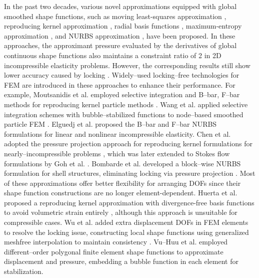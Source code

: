 In the past two decades, various novel approximations equipped with global smoothed shape functions, such as moving least-squares approximation \cite{belytschko1994}, reproducing kernel approximation \cite{liu1995}, radial basis functions \cite{chi2014,wang2020d}, maximum-entropy approximation \cite{ortiz-bernardin2015}, and NURBS approximation \cite{hughes2005,auricchio2010}, have been proposed.
In these approaches, the approximant pressure evaluated by the derivatives of global continuous shape functions also maintains a constraint ratio of 2 in 2D incompressible elasticity problems.
However, the corresponding results still show lower accuracy caused by locking \cite{huerta2001,dolbow1999a}.
Widely--used locking--free technologies for FEM are introduced in these approaches to enhance their performance.
For example, Moutsanidis et al. employed selective integration and B--bar, F--bar methods for reproducing kernel particle methods \cite{moutsanidis2020,moutsanidis2021}.
Wang et al. applied selective integration schemes with bubble--stabilized functions to node--based smoothed particle FEM \cite{wang2022c}.
Elguedj et al. proposed the B--bar and F--bar NURBS formulations for linear and nonlinear incompressible elasticity.
Chen et al. adopted the pressure projection approach for reproducing kernel formulations for nearly--incompressible problems \cite{chen2000}, which was later extended to Stokes flow formulations by Goh et al. \cite{goh2018}.
Bombarde et al. developed a block--wise NURBS formulation for shell structures, eliminating locking via pressure projection \cite{bombarde2022}.
Most of these approximations offer better flexibility for arranging DOFs since their shape function constructions are no longer element-dependent.
Huerta et al. proposed a reproducing kernel approximation with divergence-free basis functions to avoid volumetric strain entirely \cite{huerta2004a}, although this approach is unsuitable for compressible cases.
Wu et al. added extra displacement DOFs in FEM elements to resolve the locking issue, constructing local shape functions using generalized meshfree interpolation to maintain consistency \cite{wu2012}.
Vu--Huu et al. employed different--order polygonal finite element shape functions to approximate displacement and pressure, embedding a bubble function in each element for stabilization.

